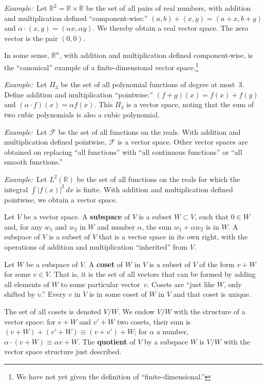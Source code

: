 \documentclass[10pt, a4paper, twocolumn]{article}
\newcommand{\R}{\mathbb{R}}
\newcommand{\defn}[1]{\textbf{#1}}
\newcommand{\eg}{\emph{Example:}\relax}
\begin{document}
\eg\ Let $\R^2 = \R \times \R$ be the set of all pairs of real numbers, with addition
and multiplication defined “component-wise:” $(a, b) + (x, y) = (a + x, b + y)$
and $\alpha \cdot (x, y) = (\alpha x, \alpha y)$. We thereby obtain a real vector space. The zero
vector is the pair $(0, 0)$.

In some sense, $\R^n$, with addition and multiplication defined component-wise,
is the “canonical” example of a finite-dimensional vector space.\footnote{We
  have not yet given the definition of “finite-dimensional.”}

\eg\ Let $\Pi_3$ be the set of all polynomial functions of degree at
most~3. Define addition and multiplication “pointwise:” $(f + g)(x) = f(x) +
f(y)$ and $(\alpha \cdot f)(x) = \alpha f(x)$. This $\Pi_3$ is a vector space, noting that the
sum of two cubic polynomials is also a cubic polynomial.

\eg\ Let $\mathcal{F}$ be the set of all functions on the reals. With addition
and multiplication defined pointwise, $\mathcal{F}$ is a vector space. Other
vector spaces are obtained on replacing “all functions” with “all continuous
functions” or “all smooth functions.”

\eg\ Let $L^2(\R)$ be the set of all functions on the reals for which the integral
$\int |f(x)|^2\,dx$ is finite. With addition and multiplication defined pointwise,
we obtain a vector space.

Let $V$ be a vector space. A \defn{subspace} of $V$ is a subset $W \subset V$, such
that $0\in W$ and, for any $w_1$ and $w_2$ in $W$ and number $\alpha$, the sum $w_1 + \alpha
w_2$ is in $W$. A subspace of $V$ is a subset of $V$ that is a vector space in
its own right, with the operations of addition and multiplication “inherited”
from $V$.

Let $W$ be a subspace of $V$. A \defn{coset} of $W$ in $V$ is a subset of $V$ of
the form $v + W$ for some $v\in V$. That is, it is the set of all vectors that can
be formed by adding all elements of $W$ to some particular vector~$v$. Cosets
are “just like $W$, only shifted by $v$.” Every $v$ in $V$ is in some coset of
$W$ in $V$ and that coset is unique.

The set of all cosets is denoted $V/W$. We endow $V/W$ with the structure of a
vector space: for $v+W$ and $v'+W$ two cosets, their sum is $(v+W)+(v'+W) \equiv
(v+v')+W$; for $\alpha$ a number, $\alpha\cdot(v+W)\equiv \alpha v+W$. The \defn{quotient} of $V$ by a
subspace $W$ is $V/W$ with the vector space structure just described.
\end{document}
